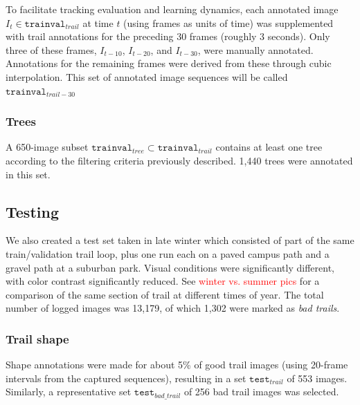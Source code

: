 \documentclass[letterpaper, 10 pt, conference]{ieeeconf}  %
\newcommand{\comment}[1]{\textcolor{red}{#1}}
\newcommand{\TrailAnnotatedSet}{\mathtt{trainval}_{trail}}
\newcommand{\TrailBadAnnotatedSet}{\mathtt{trainval}_{bad\_trail}}
\newcommand{\TrailSeqAnnotatedSet}{\mathtt{trainval}_{trail-30}}
\newcommand{\TreeAnnotatedSet}{\mathtt{trainval}_{tree}}
\newcommand{\TrailTestAnnotatedSet}{\mathtt{test}_{trail}}
\newcommand{\TrailTestBadAnnotatedSet}{\mathtt{test}_{bad\_trail}}
\begin{document}
To facilitate tracking evaluation and learning
dynamics, each annotated image $I_{t} \in \TrailAnnotatedSet$ at time
$t$ (using frames as units of time) was supplemented with trail
annotations for the preceding 30 frames (roughly 3 seconds).  Only
three of these frames, $I_{t-10}$, $I_{t-20}$, and $I_{t-30}$, were
manually annotated.  Annotations for the remaining frames were derived
from these through cubic interpolation.  This set of
annotated image sequences will be called $\TrailSeqAnnotatedSet$



\subsubsection{Trees} A 650-image subset $\TreeAnnotatedSet \subset
\TrailAnnotatedSet$ contains at least one tree according to the
filtering criteria previously described.  1,440 trees were
annotated in this set.


\subsection{Testing}

We also created a test set taken in late winter which consisted
of part of the same train/validation trail loop, plus one run each on a paved campus
path and a gravel path at a suburban park.  Visual conditions were
significantly different, with color contrast significantly reduced.
See \comment{winter vs. summer pics} for a comparison of the same
section of trail at different times of year.  The total number of
logged images was 13,179, of which 1,302 were marked as \textit{bad
  trails}.

\subsubsection{Trail shape} Shape annotations were made for about 5\% of good trail images (using 20-frame intervals
from the captured sequences), resulting in a set
$\TrailTestAnnotatedSet$ of 553 images.  Similarly, a
representative set $\TrailTestBadAnnotatedSet$ of 256 bad trail
images was selected.
\end{document}
